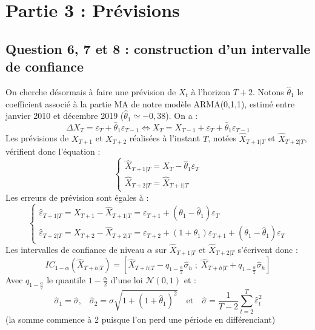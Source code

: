 \documentclass[]{article}
\begin{document}
\hypertarget{partie-3-pruxe9visions}{%
\section{Partie 3 : Prévisions}\label{partie-3-pruxe9visions}}

\hypertarget{question-6-7-et-8-construction-dun-intervalle-de-confiance}{%
\subsection{Question 6, 7 et 8 : construction d'un intervalle de confiance}\label{question-6-7-et-8-construction-dun-intervalle-de-confiance}}

On cherche désormais à faire une prévision de \(X_t\) à l'horizon \(T+2\).
Notons \(\hat\theta_1\) le coefficient associé à la partie MA de notre modèle ARMA(0,1,1), estimé entre janvier 2010 et décembre 2019 (\(\hat\theta_1\simeq -0,38\)). On a :
\[
\Delta X_T = \varepsilon_T + \hat\theta_1\varepsilon_{T-1}
\iff 
X_T = X_{T-1} + \varepsilon_T + \hat\theta_1\varepsilon_{T-1}
\]
Les prévisions de \(X_{T+1}\) et \(X_{T+2}\) réalisées à l'instant \(T\), notées \(\hat X_{T+1\vert T}\) et \(\hat X_{T+2\vert T}\), vérifient donc l'équation :
\[
\begin{cases}
\hat X_{T+1\vert T}=X_T - \hat\theta_1\varepsilon_T \\
\hat X_{T+2\vert T}=\hat X_{T+1\vert T}
\end{cases}
\]
Les erreurs de prévision sont égales à :
\[
\begin{cases}
\hat \varepsilon_{T+1\vert T} = X_{T+1} - \hat X_{T+1\vert T}=
\varepsilon_{T+1}+(\theta_1-\hat\theta_1)\varepsilon_T
\\
\hat \varepsilon_{T+2\vert T} = X_{T+2} - \hat X_{T+2\vert T}=
\varepsilon_{T+2}+(1+\theta_1)\varepsilon_{T+1}+(\theta_1-\hat\theta_1)\varepsilon_T 
\end{cases}
\]
Les intervalles de confiance de niveau \(\alpha\) sur \(\hat X_{T+1\vert T}\) et \(\hat X_{T+2\vert T}\) s'écrivent donc :
\[
IC_{1-\alpha}(\hat X_{T+h\vert T}) =
\left[
\hat X_{T+h\vert T}-q_{1-\frac \alpha 2}\hat{\sigma}_h\;;\;
\hat X_{T+h\vert T}+q_{1-\frac \alpha 2}\hat{\sigma}_h
\right]
\]
Avec \(q_{1-\frac \alpha 2}\) le quantile \(1-\frac \alpha 2\) d'une loi \(\mathcal N(0,1)\) et :
\[
\hat \sigma_1 = \hat\sigma\text{,}\quad
\hat\sigma_2=\hat\sigma\sqrt{1+(1+\hat \theta_1)^2}\quad\text{et}
\quad 
\hat\sigma = \frac{1}{T-2}\sum_{t=2}^T\hat\varepsilon_t^2
\]
(la somme commence à 2 puisque l'on perd une période en différenciant)
\end{document}

